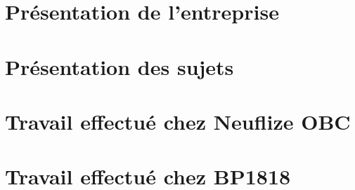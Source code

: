 \documentclass[11pt,twoside]{scrreprt}
\begin{document}
\chapter{Présentation de l'entreprise}

	


\chapter{Présentation des sujets}
	
	
	
\chapter{Travail effectué chez Neuflize OBC}

	
	

\chapter{Travail effectué chez BP1818}
\end{document}
